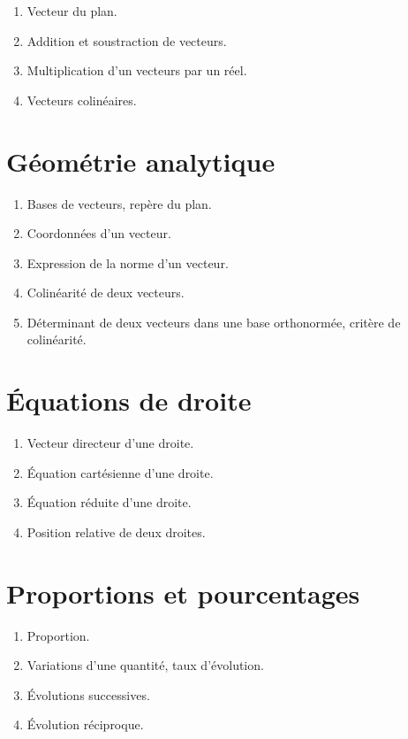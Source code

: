 \documentclass[10pt,a4paper]{article}
\begin{document}
\begin{enumerate}
\item  Vecteur du plan.
\item  Addition et soustraction de vecteurs.
\item  Multiplication d'un vecteurs par un réel.
\item  Vecteurs colinéaires.
\end{enumerate}


\section{Géométrie analytique}


\begin{enumerate}
\item Bases de vecteurs, repère du plan. 
\item Coordonnées d'un vecteur. 
\item Expression de la norme d'un vecteur.
\item Colinéarité de deux vecteurs.
\item Déterminant de deux vecteurs dans une base orthonormée, critère de colinéarité. 
\end{enumerate}


 
\section{Équations de droite}


\begin{enumerate}
\item Vecteur directeur d'une droite.
\item Équation cartésienne d'une droite.
\item Équation réduite d'une droite.
\item Position relative de deux droites.
\end{enumerate}


\section{Proportions et pourcentages}


\begin{enumerate}
\item Proportion.
\item Variations d'une quantité, taux d'évolution.
\item Évolutions successives.
\item Évolution réciproque.
\end{enumerate}
\end{document}
